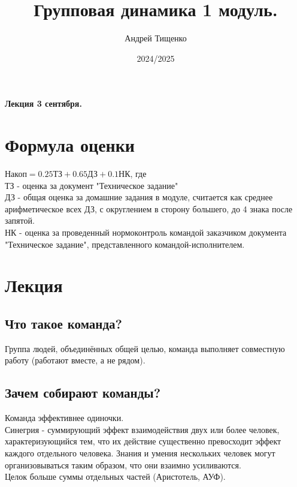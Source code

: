 \documentclass[12pt, letterpaper, twoside]{article}
\title{Групповая динамика 1 модуль.}
\author{Андрей Тищенко}
\date{2024/2025}
\begin{document}
    \maketitle
    \begin{center}
        \textbf{Лекция 3 сентября.}
    \end{center}
    \section*{Формула оценки}
    $\text{Накоп} = 0.25\text{ТЗ} + 0.65\text{ДЗ} + 0.1\text{НК}$, где \\
    ТЗ - оценка за документ "Техническое задание"\\
    ДЗ - общая оценка за домашние задания в модуле, считается как среднее арифметическое всех ДЗ, с округлением в сторону большего, до 4 знака после запятой.\\
    НК - оценка за проведенный нормоконтроль командой заказчиком документа "Техническое задание", представленного командой-исполнителем.
    \section{Лекция}
    \subsection*{Что такое команда?}
    Группа людей, объединённых общей целью, команда выполняет совместную работу (работают вместе, а не рядом).
    \subsection*{Зачем собирают команды?}
    Команда эффективнее одиночки.\\
    Синегрия - суммирующий эффект взаимодействия двух или более человек, характеризующийся тем, что их действие существенно превосходит эффект каждого отдельного человека. Знания и умения нескольких человек могут организовываться таким образом, что они взаимно усиливаются.\\
    Целок больше суммы отдельных частей (Аристотель, АУФ).
\end{document}
